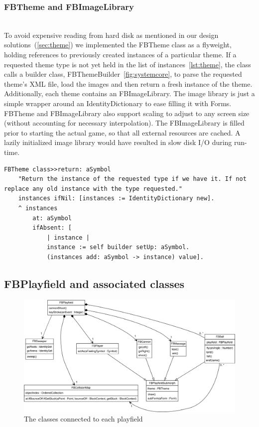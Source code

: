\subsubsection{FBTheme and FBImageLibrary}~\\ 
To avoid expensive reading from hard disk as mentioned in our design solutions~(\ref{sec:theme})
we implemented the FBTheme class as a flyweight, holding references to previously 
created instances of a particular theme. If a requested theme type is not yet 
held in the list of instances~\ref{lst:theme}, the class calls a builder class, 
FBThemeBuilder~\ref{fig:systemcore}, to parse the requested theme's XML file, 
load the images and then return a fresh instance of the theme. Additionally, 
each theme contains an FBImageLibrary. The image library is just a simple 
wrapper around an IdentityDictionary to ease filling it with Forms. 
FBTheme and FBImageLibrary also support scaling to adjust to any screen 
size (without accounting for necessary interpolation).
The FBImageLibrary is filled prior to starting the actual game, so 
that all external resources are cached. A lazily initialized image 
library would have resulted in slow disk I/O during
run-time.
%
\begin{lstlisting}[language=Smalltalk, label=lst:theme, caption= FBTheme "return:" method, float]
FBTheme class>>return: aSymbol
    "Return the instance of the requested type if we have it. If not replace any old instance with the type requested."
    instances ifNil: [instances := IdentityDictionary new].
    ^ instances 
        at: aSymbol 
        ifAbsent: [
            | instance |
            instance := self builder setUp: aSymbol.
            (instances add: aSymbol -> instance) value].
\end{lstlisting}
%
\subsection{FBPlayfield and associated classes}
%
\begin{figure}[bt]
  \begin{center}
    \includegraphics[width=\linewidth]{images/systemplay.png}
  \end{center}
  \caption{The classes connected to each playfield}
  \label{fig:systemplay}
\end{figure}
%
